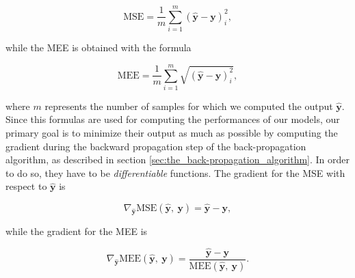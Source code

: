 		\begin{equation*}
		    \text{MSE} = \frac{1}{m}\sum_{i = 1}^{m}\left ( \hat{\mathbf{y}} - \mathbf{y} \right )^{2}_{i},
		\end{equation*}

		while the MEE is obtained with the formula

		\begin{equation*}
		    \text{MEE} = \frac{1}{m}\sum_{i = 1}^{m}\sqrt{\left (\hat{\mathbf{y}} - \mathbf{y} \right )^{2}_{i}},
		\end{equation*}

		where $m$ represents the number of samples for which we computed the output $\hat{\mathbf{y}}$. Since this
		formulas are used for computing the performances of our models, our primary goal is to minimize their
		output as much as possible by computing the gradient during the backward propagation step of the
		back-propagation algorithm, as described in section \ref{sec:the_back-propagation_algorithm}. In order to
		do so, they have to be \textit{differentiable} functions. The gradient for the MSE with respect to
		$\hat{\mathbf{y}}$ is

		\begin{equation*}
		     \nabla_{\hat{\mathbf{y}}}\text{MSE}\left(\hat{\mathbf{y}},\ \mathbf{y}\right) =
		     \hat{\mathbf{y}} - \mathbf{y},
		\end{equation*}

		while the gradient for the MEE is

		\begin{equation*}
		     \nabla_{\hat{\mathbf{y}}}\text{MEE}\left(\hat{\mathbf{y}},\ \mathbf{y}\right) =
		     \frac{\hat{\mathbf{y}} - \mathbf{y}}{\text{MEE}\left(\hat{\mathbf{y}},\ \mathbf{y}\right)}.
		\end{equation*}

